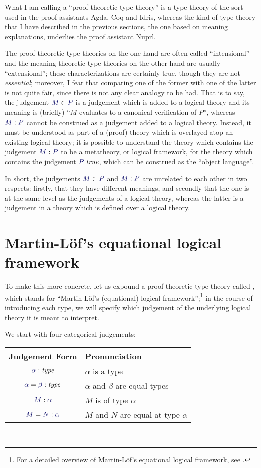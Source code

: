 \documentclass[main.tex]{subfiles}
\begin{document}
What I am calling a ``proof-theoretic type theory'' is a type theory of the
sort used in the proof assistants Agda, Coq and Idris, whereas the kind of
type theory that I have described in the previous sections, the one based on
meaning explanations, underlies the proof assistant Nuprl.

The proof-theoretic type theories on the one hand are often called
``intensional'' and the meaning-theoretic type theories on the other
hand are usually ``extensional''; these characterizations are
certainly true, though they are not \emph{essential}; moreover, I fear
that comparing one of the former with one of the latter is not quite
fair, since there is not any clear analogy to be had. That is to say,
the judgement $\ver{M}{P}$ is a judgement which is added to a logical
theory and its meaning is (briefly) ``$M$ evaluates to a canonical
verification of $P$'', whereas $\ofty{M}{P}$ cannot be construed as a
judgement added to a logical theory. Instead, it must be understood as
part of a (proof) theory which is overlayed atop an existing logical theory;
it is possible to understand the theory which contains the judgement
$\ofty{M}{P}$ to be a metatheory, or logical framework, for the theory which
contains the judgement $\istrue{P}$, which can be construed as the
``object language''.

In short, the judgements $\ver{M}{P}$ and $\ofty{M}{P}$ are unrelated to each other in
two respects: firstly, that they have different meanings, and secondly that the
one is at the same level as the judgements of a logical theory, whereas the
latter is a judgement in a theory which is defined over a logical theory.

\section{Martin-L\"of's equational logical framework}

To make this more concrete, let us expound a proof theoretic type
theory called \MLLF, which stands for ``Martin-L\"of's (equational) logical
framework'';\footnote{For a detailed overview of Martin-L\"of's equational logical framework, see \cite{PiMLTT}.} in the course of introducing each type, we will specify
which judgement of the underlying logical theory it is meant to
interpret.

We start with four categorical judgements:\\

\begin{tabular}{c|l}
Judgement Form & Pronunciation \\ \hline
  $\type{\alpha}$ & $\alpha$ is a type \\
  $\etype{\alpha}{\beta}$ & $\alpha$ and $\beta$ are equal types \\
  $\ofty{M}{\alpha}$ & $M$ is of type $\alpha$ \\
  $\eofty{M}{N}{\alpha}$ & $M$ and $N$ are equal at type $\alpha$ \\
\end{tabular}\\
\end{document}
